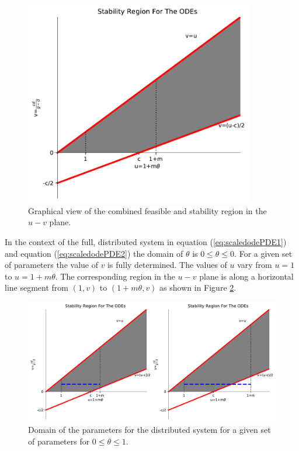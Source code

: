 \documentclass[12pt]{article}
\begin{document}
\begin{figure}[htb]
  \centering
  \includegraphics[width=10cm]{odeStability-uv-plane.pdf}
  \caption[Stability region in the $u-v$ plane.]{Graphical view of the
    combined feasible and stability region in the $u-v$ plane.}
  \label{fig:uvStabilityRegion}
\end{figure}

In the context of the full, distributed system in equation
(\ref{eq:scaledodePDE1}) and equation (\ref{eq:scaledodePDE2}) the
domain of $\theta$ is $0\leq\theta\leq 0$. For a given set of
parameters the value of $v$ is fully determined. The values of $u$
vary from $u=1$ to $u=1+m\theta$.  The corresponding region in the
$u-v$ plane is along a horizontal line segment from $(1,v)$ to
$(1+m\theta,v)$ as shown in Figure \ref{fig:distributedLineSegment}.

\begin{figure}[htb]
  \centering
  \includegraphics[width=12cm]{odeStability-uv-plane-Line.pdf}
  \caption[Domain of the distributed system in the $u-v$
  plane.]{Domain of the parameters for the distributed system for a
    given set of parameters for $0\leq\theta\leq 1$.}
  \label{fig:distributedLineSegment}
\end{figure}
\end{document}
